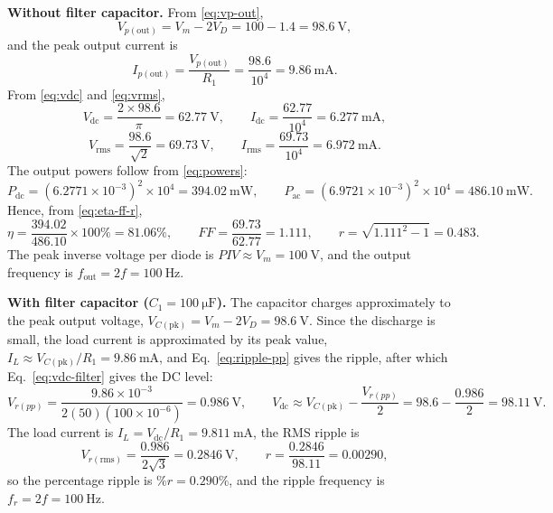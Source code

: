 \documentclass[12pt,a4paper]{article}
\begin{document}
	\textbf{Without filter capacitor.} From \eqref{eq:vp-out},
	\begin{equation}
		V_{p(\mathrm{out})} = V_m - 2V_D = 100 - 1.4 = \SI{98.6}{\volt},
		\label{eq:calc-vp}
	\end{equation}
	and the peak output current is
	\begin{equation}
		I_{p(\mathrm{out})} = \frac{V_{p(\mathrm{out})}}{R_1}
		= \frac{98.6}{10^{4}} = \SI{9.86}{\milli\ampere}.
		\label{eq:calc-ipk}
	\end{equation}
	From \eqref{eq:vdc} and \eqref{eq:vrms},
	\begin{equation}
		V_{\mathrm{dc}} = \frac{2 \times 98.6}{\pi} = \SI{62.77}{\volt},
		\qquad
		I_{\mathrm{dc}} = \frac{62.77}{10^{4}} = \SI{6.277}{\milli\ampere},
		\label{eq:calc-vdc}
	\end{equation}
	\begin{equation}
		V_{\mathrm{rms}} = \frac{98.6}{\sqrt{2}} = \SI{69.73}{\volt},
		\qquad
		I_{\mathrm{rms}} = \frac{69.73}{10^{4}} = \SI{6.972}{\milli\ampere}.
		\label{eq:calc-vrms}
	\end{equation}
	The output powers follow from \eqref{eq:powers}:
	\begin{equation}
		P_{\mathrm{dc}} = (6.2771\times 10^{-3})^{2}\times 10^{4} = \SI{394.02}{\milli\watt},
		\qquad
		P_{\mathrm{ac}} = (6.9721\times 10^{-3})^{2}\times 10^{4} = \SI{486.10}{\milli\watt}.
		\label{eq:calc-powers}
	\end{equation}
	Hence, from \eqref{eq:eta-ff-r},
	\begin{equation}
		\eta = \frac{394.02}{486.10}\times 100\% = 81.06\%,
		\qquad
		FF = \frac{69.73}{62.77} = 1.111,
		\qquad
		r = \sqrt{1.111^{2}-1} = 0.483 .
		\label{eq:calc-eta}
	\end{equation}
	The peak inverse voltage per diode is $PIV \approx V_m = \SI{100}{\volt}$, and the output frequency is $f_{\mathrm{out}} = 2f = \SI{100}{\hertz}$.
	
	\textbf{With filter capacitor ($C_1 = \SI{100}{\micro\farad}$).} The capacitor charges approximately to the peak output voltage, $V_{C(\mathrm{pk})} = V_m - 2V_D = \SI{98.6}{\volt}$. Since the discharge is small, the load current is approximated by its peak value, $I_L \approx V_{C(\mathrm{pk})}/R_1 = \SI{9.86}{\milli\ampere}$, and Eq.~\eqref{eq:ripple-pp} gives the ripple, after which Eq.~\eqref{eq:vdc-filter} gives the DC level:
	\begin{equation}
		V_{r(pp)} = \frac{9.86\times10^{-3}}{2(50)(100\times10^{-6})} = \SI{0.986}{\volt},
		\qquad
		V_{\mathrm{dc}} \approx V_{C(\mathrm{pk})} - \frac{V_{r(pp)}}{2} = 98.6 - \frac{0.986}{2} = \SI{98.11}{\volt}.
		\label{eq:calc-vdc-100u}
	\end{equation}
	The load current is $I_L = V_{\mathrm{dc}}/R_1 = \SI{9.811}{\milli\ampere}$, the RMS ripple is
	\begin{equation}
		V_{r(\mathrm{rms})} = \frac{0.986}{2\sqrt{3}} = \SI{0.2846}{\volt},
		\qquad
		r = \frac{0.2846}{98.11} = 0.00290,
		\label{eq:calc-r-100u}
	\end{equation}
	so the percentage ripple is $\%r = 0.290\%$, and the ripple frequency is $f_r = 2f = \SI{100}{\hertz}$.
	
\end{document}
